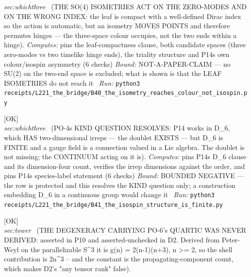 \begin{description}
\textit{sec:whichthree} \ (THE SO(4) ISOMETRIES ACT ON THE ZERO-MODES AND ON THE WRONG INDEX: the leaf is compact with a well-defined Dirac index so the action is automatic, but an isometry MOVES POINTS and therefore permutes hinges --- the three-space colour occupies, not the two ends within a hinge). 
\emph{Computes:} pins the leaf-compactness clause, both candidate spaces (three zero-modes vs two timelike hinge ends), the triality structure and P14s own colour/isospin asymmetry (6 checks)
 \emph{Bound:} NOT-A-PAPER-CLAIM --- no SU(2) on the two-end space is excluded; what is shown is that the LEAF ISOMETRIES do not reach it
\ \emph{Run:} \texttt{python3 receipts/L221\_the\_bridge/B40\_the\_isometry\_reaches\_colour\_not\_isospin.py}
\item[\label{rcpt:B41_the_isospin_structure_is_finite}\texttt{B41\_the\_isospin\_structure\_is\_finite}]\hfill\textsf{[OK]}\\
\textit{sec:whichthree} \ (PO-4s KIND QUESTION RESOLVES: P14 works in D\_6, which HAS two-dimensional irreps --- the doublet EXISTS --- but D\_6 is FINITE and a gauge field is a connection valued in a Lie algebra. The doublet is not missing; the CONTINUUM acting on it is). 
\emph{Computes:} pins P14s D\_6 clause and its dimension-four count, verifies the irrep dimensions against the order, and pins P14s species-label statement (6 checks)
 \emph{Bound:} BOUNDED NEGATIVE --- the row is protected and this resolves the KIND question only; a construction embedding D\_6 in a continuous group would change it
\ \emph{Run:} \texttt{python3 receipts/L221\_the\_bridge/B41\_the\_isospin\_structure\_is\_finite.py}
\item[\label{rcpt:D1_the_degeneracy_carrying_the_quartic_was_never_derived_and_its_constant_is_the_component_count}\texttt{D1\_the\_degeneracy\_carrying\_the\_quartic\_was\_never\_derived\_and\_its\_constant\_is\_the\_component\_count}]\hfill\textsf{[OK]}\\
\textit{sec:tower} \ (THE DEGENERACY CARRYING PO-6's QUARTIC WAS NEVER DERIVED: asserted in P10 and asserted-unchecked in D2. Derived from Peter-Weyl on the parallelizable S\textasciicircum{}3 it is g(n) = 2(n-1)(n+3), n >= 2, so the shell contribution is 2n\textasciicircum{}3 -- and the constant is the propagating-component count, which makes D2's "any tensor rank" false). 

\end{description}
